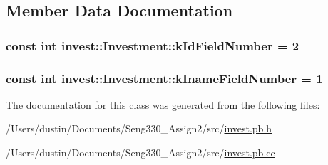 \subsection{Member Data Documentation}
\hypertarget{classinvest_1_1_investment_a2aefbb43abeccada3705743e66c3f9b0}{}
\subsubsection[{k\+Id\+Field\+Number}]{\setlength{\rightskip}{0pt plus 5cm}const int invest\+::\+Investment\+::k\+Id\+Field\+Number = 2\hspace{0.3cm}{\ttfamily [static]}}\label{classinvest_1_1_investment_a2aefbb43abeccada3705743e66c3f9b0}
\hypertarget{classinvest_1_1_investment_a651f1cb02c3147523a22ee0682af0c64}{}
\subsubsection[{k\+Iname\+Field\+Number}]{\setlength{\rightskip}{0pt plus 5cm}const int invest\+::\+Investment\+::k\+Iname\+Field\+Number = 1\hspace{0.3cm}{\ttfamily [static]}}\label{classinvest_1_1_investment_a651f1cb02c3147523a22ee0682af0c64}


The documentation for this class was generated from the following files\+:\begin{DoxyCompactItemize}
\item 
/\+Users/dustin/\+Documents/\+Seng330\+\_\+\+Assign2/src/\hyperlink{invest_8pb_8h}{invest.\+pb.\+h}\item 
/\+Users/dustin/\+Documents/\+Seng330\+\_\+\+Assign2/src/\hyperlink{invest_8pb_8cc}{invest.\+pb.\+cc}\end{DoxyCompactItemize}
